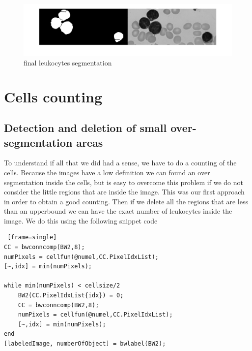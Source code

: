 \begin{figure}
	\begin{center}
		\centering
		\includegraphics[scale=0.3]{img/segmentation.png}
		\caption{final leukocytes segmentation }
		\label{fig:bwarea}
	\end{center}
\end{figure}

\section{Cells counting}
\subsection{Detection and deletion of small over-segmentation areas}
To understand if all that we did had a sense, we have to do a counting of the cells. Because the images have a low definition we can found an over segmentation inside the cells, but is easy to overcome this problem if we do not consider the little regions that are inside the image. This was our first approach in order to obtain a good counting. Then if we delete all the regions that are less than an upperbound we can have the exact number of leukocytes inside the image. We do this using the following snippet code
\bigskip
\begin{minipage}{\linewidth}
\begin{lstlisting} [frame=single]
CC = bwconncomp(BW2,8);
numPixels = cellfun(@numel,CC.PixelIdxList);
[~,idx] = min(numPixels);

while min(numPixels) < cellsize/2
    BW2(CC.PixelIdxList{idx}) = 0;
    CC = bwconncomp(BW2,8);
    numPixels = cellfun(@numel,CC.PixelIdxList);
    [~,idx] = min(numPixels);
end
[labeledImage, numberOfObject] = bwlabel(BW2);
\end{lstlisting}
\end{minipage}
\bigskip

